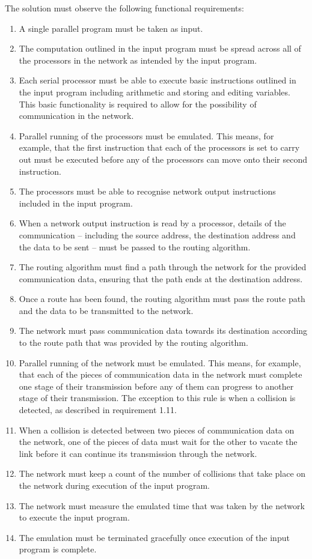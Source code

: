 \documentclass[a4paper, 12pt]{article}
\begin{document}
The solution must observe the following functional requirements:
\begin{enumerate}[leftmargin=*,labelindent=15pt,label=\bfseries 1.\arabic*] 
	\item A single parallel program must be taken as input. 
	\item The computation outlined in the input program must be spread across all of the processors in the network as intended by the input program.
	\item Each serial processor must be able to execute basic instructions outlined in the input program including arithmetic and storing and editing variables. This basic functionality is required to allow for the possibility of communication in the network.
	\item Parallel running of the processors must be emulated. This means, for example, that the first instruction that each of the processors is set to carry out must be executed before any of the processors can move onto their second instruction.
	\item The processors must be able to recognise network output instructions included in the input program.
	\item When a network output instruction is read by a processor, details of the communication -- including the source address, the destination address and the data to be sent -- must be passed to the routing algorithm.
	\item The routing algorithm must find a path through the network for the provided communication data, ensuring that the path ends at the destination address.
	\item Once a route has been found, the routing algorithm must pass the route path and the data to be transmitted to the network.
	\item The network must pass communication data towards its destination according to the route path that was provided by the routing algorithm.
	\item Parallel running of the network must be emulated. This means, for example, that each of the pieces of communication data in the network must complete one stage of their transmission before any of them can progress to another stage of their transmission. The exception to this rule is when a collision is detected, as described in requirement 1.11.
	\item When a collision is detected between two pieces of communication data on the network, one of the pieces of data must wait for the other to vacate the link before it can continue its transmission through the network.
	\item The network must keep a count of the number of collisions that take place on the network during execution of the input program.
	\item The network must measure the emulated time that was taken by the network to execute the input program.
	\item The emulation must be terminated gracefully once execution of the input program is complete.  
\end{enumerate}
\end{document}
